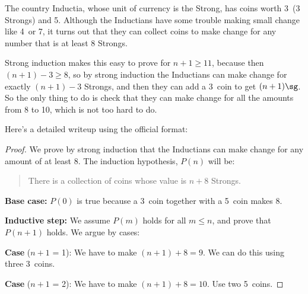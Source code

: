 The country Inductia, whose unit of currency is the Strong, has coins
worth 3\sg\ (3 Strongs) and 5\sg.  Although the Inductians have some
trouble making small change like 4\sg\ or 7\sg, it turns out that they
can collect coins to make change for any number that is at least 8
Strongs.

Strong induction makes this easy to prove for $n+1 \ge 11$, because then
$(n+1)-3 \ge 8$, so by strong induction the Inductians can make change for
exactly $(n+1)-3$ Strongs, and then they can add a 3\sg\ coin to get
$(n+1)\sg$.  So the only thing to do is check that they can make change
for all the amounts from 8 to 10\sg, which is not too hard to do.

Here's a detailed writeup using the official format:

\begin{proof}

  We prove by strong induction that the Inductians can make change for any
  amount of at least 8\sg.  The induction hypothesis, $P(n)$ will be:
\begin{quote}
There is a collection of coins whose value is $n+8$ Strongs.
\end{quote}

\iffalse
\begin{editingnotes}
Notice that $P(n)$ is an implication.  When the hypothesis of an
implication is false, we know the whole implication is true.  In this
situation, the implication is said to be \emph{vacuously} true.  So $P(n)$
will be vacuously true whenever $n < 8$.
\iffalse
\footnote{Another approach that
avoids these vacuous cases is to define
\[
Q(n) \eqdef \text{there is a collection of coins whose value is $n+8\sg$},
\]
and prove that $Q(n)$ holds for all $n \geq 0$.
\iffalse
The solution to
\href{http://courses.csail.mit.edu/6.042/spring06/solutions/cp3fsol.pdf}
{Class Problem 1 from Spring '06, Friday, Feb. 24} uses this approach.\fi
}\fi

We now proceed with the induction proof:
\end{editingnotes}\fi

\textbf{Base case:} $P(0)$ is true because a 3\sg\ coin together with
a 5\sg\ coin makes 8\sg.

\textbf{Inductive step:}  We assume $P(m)$ holds for all $m \leq n$, and
prove that $P(n+1)$ holds.  We argue by cases:

\textbf{Case} ($n+1$ = 1): We have to make $(n+1) +8 =9$\sg.  We can do this using three 3\sg\ coins.

\textbf{Case} ($n+1$ = 2): We have to make $(n+1) +8 =10$\sg.  Use two
5\sg\ coins.


\end{proof}
